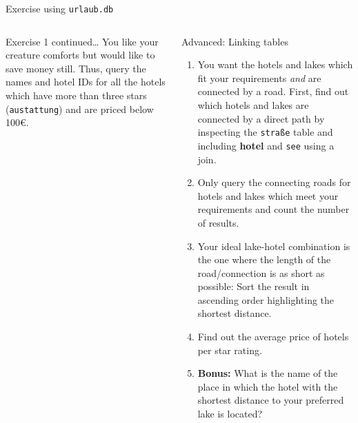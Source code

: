 \begin{frame}[fragile]{Exercise using \texttt{urlaub.db}}
  \begin{columns}[T,onlytextwidth]
      \begin{exampleblock}{Exercise 1 continued\dots}\footnotesize
You like your creature comforts but would like to save money still. Thus, query the names and hotel IDs for all the hotels which have more than three stars (\texttt{austattung}) and are priced below 100€.
      \end{exampleblock}


      \begin{alertblock}{Advanced: Linking tables}\scriptsize
      \begin{enumerate}
          \item You want the hotels and lakes which fit your requirements \emph{and} are connected by a road. First, find out which hotels and lakes are connected by a direct path by inspecting the \texttt{straße} table and including \textbf{hotel} and \texttt{see} using a join.
          \item Only query the connecting roads for hotels and lakes which meet your requirements and count the number of results. 
          \item Your ideal lake-hotel combination is the one where the length of the road/connection is as short as possible: Sort the result in ascending order highlighting the shortest distance. \\
          \item Find out the average price of hotels per star rating. \\
          \item \textbf{Bonus:} What is the name of the place in which the hotel with the shortest distance to your preferred lake is located? 
      \end{enumerate}
      \end{alertblock}

  \end{columns}
\end{frame}


